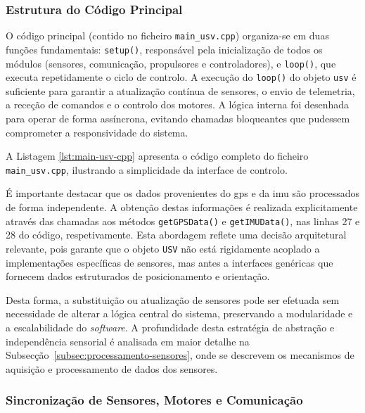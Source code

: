 \subsubsection{Estrutura do Código Principal}

O código principal (contido no ficheiro \texttt{main\_usv.cpp}) organiza-se em duas funções fundamentais: \texttt{setup()}, responsável pela inicialização de todos os módulos (sensores, comunicação, propulsores e controladores), e \texttt{loop()}, que executa repetidamente o ciclo de controlo. A execução do \texttt{loop()} do objeto \texttt{\gls{usv}} é suficiente para garantir a atualização contínua de sensores, o envio de telemetria, a receção de comandos e o controlo dos motores. A lógica interna foi desenhada para operar de forma assíncrona, evitando chamadas bloqueantes que pudessem comprometer a responsividade do sistema. 

A Listagem \ref{lst:main-usv-cpp} apresenta o código completo do ficheiro \texttt{main\_usv.cpp}, ilustrando a simplicidade da interface de controlo.



É importante destacar que os dados provenientes do \gls{gps} e da \gls{imu} são processados de forma independente. A obtenção destas informações é realizada explicitamente através das chamadas aos métodos \texttt{getGPSData()} e \texttt{getIMUData()}, nas linhas 27 e 28 do código, respetivamente. Esta abordagem reflete uma decisão arquitetural relevante, pois garante que o objeto \texttt{USV} não está rigidamente acoplado a implementações específicas de sensores, mas antes a interfaces genéricas que fornecem dados estruturados de posicionamento e orientação.  

Desta forma, a substituição ou atualização de sensores pode ser efetuada sem necessidade de alterar a lógica central do sistema, preservando a modularidade e a escalabilidade do \emph{software}. A profundidade desta estratégia de abstração e independência sensorial é analisada em maior detalhe na Subsecção~\ref{subsec:processamento-sensores}, onde se descrevem os mecanismos de aquisição e processamento de dados dos sensores.

\subsubsection{Sincronização de Sensores, Motores e Comunicação}  

